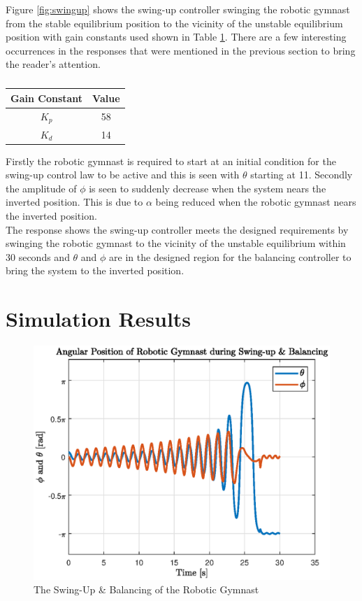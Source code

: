 Figure \ref{fig:swingup} shows the swing-up controller swinging the robotic gymnast from the stable equilibrium position to the vicinity of the unstable equilibrium position with gain constants used shown in Table \ref{table:gain_constants}. There are a few interesting occurrences in the responses that were mentioned in the previous section to bring the reader's attention.\\

\begin{table}[]
	\centering
	\begin{tabular}{|c|c|}
		\hline
		Gain Constant & Value \\
		\hline
		\hline
		$K_{p}$  & 58 \\
		\hline
		$K_{d}$  & 14 \\
		\hline
	\end{tabular}
	\caption{}
	\label{table:gain_constants}
	\end{table}

Firstly the robotic gymnast is required to start at an initial condition for the swing-up control law to be active and this is seen with $\theta$ starting at 11\textdegree. Secondly the amplitude of $\phi$ is seen to suddenly decrease when the system nears the inverted position. This is due to $\alpha$ being reduced when the robotic gymnast nears the inverted position.\\

The response shows the swing-up controller meets the designed requirements by swinging the robotic gymnast to the vicinity of the unstable equilibrium within 30 seconds and $\theta$ and $\phi$ are in the designed region for the balancing controller to bring the system to the inverted position.



\section{Simulation Results}
\begin{figure}[h]
	\centering
	\includegraphics[scale=1]{./figs/swingup_balance}
	\caption{The Swing-Up \& Balancing of the Robotic Gymnast}
	\label{fig:swingup_balance}
\end{figure}

